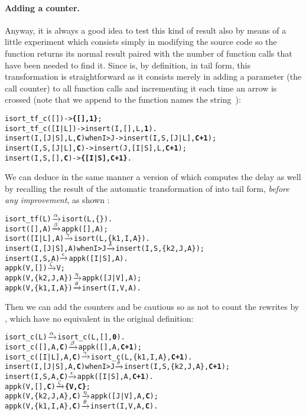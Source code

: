 \medskip

\paragraph{Adding a counter.}

Anyway, it is always a good idea to test this kind of result also by
means of a little experiment which consists simply in modifying the
source code so the function returns its normal result paired with the
number of function calls that have been needed to find it. Since
 is, by definition, in tail form, this
transformation is straightforward as it consists merely in adding a
parameter (the call counter) to all function calls and incrementing it
each time an arrow is crossed (note that we append to the function
names the string~):
\begin{alltt}
isort_tf_c(   [])              -> \textbf{\{[],1\}};
isort_tf_c([I|L])              -> insert(I,[],L,\textbf{1}).
insert(I,[J|S],L,\textbf{C}) when I > J -> insert(I,S,[J|L],\textbf{C+1});
insert(I,S,[J|L],\textbf{C})            -> insert(J,[I|S],L,\textbf{C+1});
insert(I,S,   [],\textbf{C})            -> \textbf{\{[I|S],C+1\}}.
\end{alltt}
We can deduce in the same manner a version of 
which computes the delay as well by recalling the result of the
automatic transformation of  into tail form,
\emph{before any improvement}, as shown :
\begin{alltt}
isort_tf(L)                  \(\smashedrightarrow{\alpha}\) isort(L,\{\}).
isort(   [],A)               \(\smashedrightarrow{\beta}\) appk([],A);
isort([I|L],A)               \(\smashedrightarrow{\gamma}\) isort(L,\{k1,I,A\}).
insert(I,[J|S],A) when I > J \(\smashedrightarrow{\delta}\) insert(I,S,\{k2,J,A\});
insert(I,    S,A)            \(\smashedrightarrow{\epsilon}\) appk([I|S],A).
appk(V,        [])           \(\smashedrightarrow{\zeta}\) V;
appk(V,\{k2,J,A\})             \(\smashedrightarrow{\eta}\) appk([J|V],A);
appk(V,\{k1,I,A\})             \(\smashedrightarrow{\theta}\) insert(I,V,A).
\end{alltt}
Then we can add the counters and be cautious so as not to count the
rewrites by , which have no equivalent in the original
definition:\label{code:isort_c}
\begin{alltt}
isort_c(L)                     \(\smashedrightarrow{\alpha}\) isort_c(L,[],\textbf{0}).
isort_c(   [],A,\textbf{C})             \(\smashedrightarrow{\beta}\) appk([],A,\textbf{C+1});
isort_c([I|L],A,\textbf{C})             \(\smashedrightarrow{\gamma}\) isort_c(L,\{k1,I,A\},\textbf{C+1}). 
insert(I,[J|S],A,\textbf{C}) when I > J \(\smashedrightarrow{\delta}\) insert(I,S,\{k2,J,A\},\textbf{C+1});
insert(I,    S,A,\textbf{C})            \(\smashedrightarrow{\epsilon}\) appk([I|S],A,\textbf{C+1}).
appk(V,        [],\textbf{C})           \(\smashedrightarrow{\zeta}\) \textbf{\{V,C\}};
appk(V,\{k2,J,A\},\textbf{C})             \(\smashedrightarrow{\eta}\) appk([J|V],A,\textbf{C});
appk(V,\{k1,I,A\},\textbf{C})             \(\smashedrightarrow{\theta}\) insert(I,V,A,\textbf{C}).
\end{alltt}

